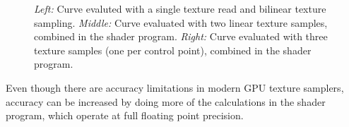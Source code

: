 \documentclass{jcgt}
\begin{document}
  \begin{figure}
    \caption{\textit{Left:} Curve evaluted with a single texture read and bilinear texture sampling.  \textit{Middle:} Curve evaluated with two linear texture samples, combined in the shader program.  \textit{Right:} Curve evaluated with three texture samples (one per control point), combined in the shader program.}   
    \label{fig:samplehwsw}
  \end{figure} 

Even though there are accuracy limitations in modern GPU texture samplers, accuracy can be increased by doing more of the calculations in the shader program, which operate at full floating point precision.
\end{document}

